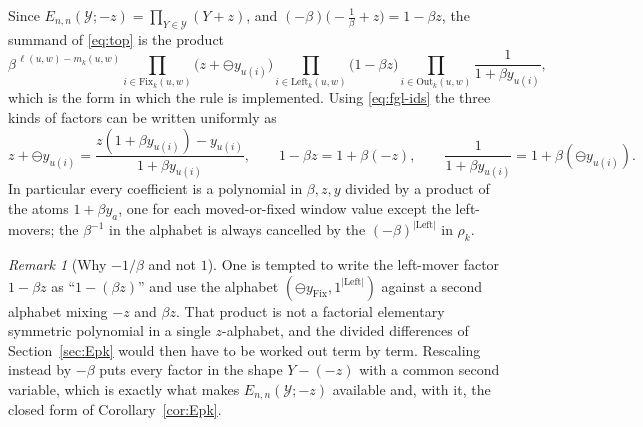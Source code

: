 \documentclass{amsart}
\theoremstyle{definition}
\theoremstyle{remark}
\newtheorem{remark}[theorem]{Remark}
\newcommand{\fgn}{\ominus}
\newcommand{\Fix}{\mathrm{Fix}}
\newcommand{\Lft}{\mathrm{Left}}
\newcommand{\Out}{\mathrm{Out}}
\begin{document}
Since $E_{n,n}(\mathcal{Y};-z) = \prod_{Y\in\mathcal{Y}}(Y+z)$, and
$(-\beta)\bigl(-\tfrac1\beta + z\bigr) = 1-\beta z$, the summand of \eqref{eq:top} is the product
\begin{equation}\label{eq:top-product}
\beta^{\,\ell(u,w) - m_k(u,w)}
\prod_{i\in\Fix_k(u,w)}\bigl(z + \fgn y_{u(i)}\bigr)
\prod_{i\in\Lft_k(u,w)}\bigl(1 - \beta z\bigr)
\prod_{i\in\Out_k(u,w)}\frac{1}{1+\beta y_{u(i)}},
\end{equation}
which is the form in which the rule is implemented. Using \eqref{eq:fgl-ids} the three kinds of
factors can be written uniformly as
\[
z + \fgn y_{u(i)} = \frac{z(1+\beta y_{u(i)}) - y_{u(i)}}{1+\beta y_{u(i)}},
\qquad
1 - \beta z = 1 + \beta(-z),
\qquad
\frac{1}{1+\beta y_{u(i)}} = 1 + \beta(\fgn y_{u(i)}).
\]
In particular every coefficient is a polynomial in $\beta, z, y$ divided by a product of the
atoms $1+\beta y_a$, one for each moved-or-fixed window value except the left-movers; the
$\beta^{-1}$ in the alphabet is always cancelled by the $(-\beta)^{|\Lft|}$ in $\rho_k$.

\begin{remark}[Why $-1/\beta$ and not $1$]
One is tempted to write the left-mover factor $1-\beta z$ as ``$1 - (\beta z)$'' and use the
alphabet $(\fgn y_{\Fix}, 1^{|\Lft|})$ against a second alphabet mixing $-z$ and $\beta z$. That
product is not a factorial elementary symmetric polynomial in a single $z$-alphabet, and the
divided differences of Section~\ref{sec:Epk} would then have to be worked out term by term.
Rescaling instead by $-\beta$ puts every factor in the shape $Y - (-z)$ with a common second
variable, which is exactly what makes $E_{n,n}(\mathcal{Y};-z)$ available and, with it, the
closed form of Corollary~\ref{cor:Epk}.
\end{remark}
\end{document}
